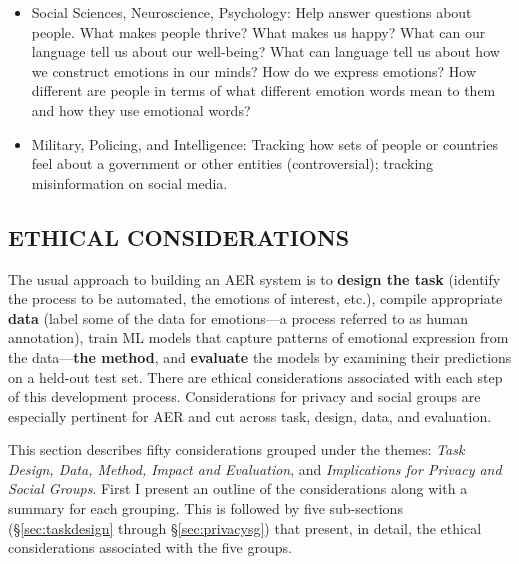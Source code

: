 \documentclass{clv3}
\begin{document}
\begin{itemize}
   \vspace*{-1mm} 
\item Social Sciences, Neuroscience, Psychology: Help answer questions about people. What makes people thrive? What makes us happy? What can our language tell us about our well-being? What can language tell us about how we construct emotions in our minds? How do we express emotions? How different are people in terms of what different emotion words mean to them and how they use emotional words? 
   \vspace*{-1mm} 
\item Military, Policing, and Intelligence: Tracking how sets of people or countries feel about a government or other entities (controversial); tracking misinformation on social media. %
\end{itemize}

\subsection{ETHICAL CONSIDERATIONS}
The usual approach to building an AER system is to \textbf{design the task} (identify the process to be automated, the emotions of interest, etc.), compile appropriate \textbf{data} (label some of the data for emotions—a process referred to as human annotation), train ML models that capture patterns of emotional expression from the data—\textbf{the method}, and \textbf{evaluate} the models by examining their predictions on a held-out test set.
There are ethical considerations associated with each step of this development process.
Considerations for privacy and social groups are especially pertinent for AER and  cut across task, design, data, and evaluation.

This section describes fifty considerations grouped under the themes: \textit{Task Design, Data, Method, Impact and Evaluation}, and \textit{Implications for Privacy and Social Groups}.  
First I present an outline of the considerations along with a summary for each grouping. This is followed by five sub-sections (\S\ref{sec:taskdesign} through \S\ref{sec:privacysg}) that present, in detail, the ethical considerations associated with the five groups.
\end{document}
